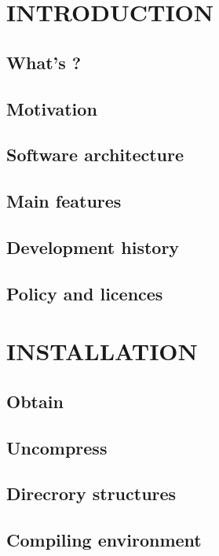 \documentclass[10pt]{book}
\begin{document}


\frontmatter

\tableofcontents

\listoffigures

\listoftables

\mainmatter
\pagestyle{fancy}

\chapter{INTRODUCTION}
\section{What's {\iqist}?}
\section{Motivation}
\section{Software architecture}
\section{Main features}
\section{Development history}
\section{Policy and licences}

\chapter{INSTALLATION}
\section{Obtain}
\section{Uncompress}
\section{Direcrory structures}
\section{Compiling environment}
\end{document}
